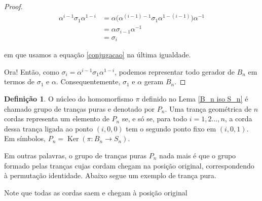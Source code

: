 \documentclass[a4paper,portuguese,11pt,twoside, leqno]{book}
\makeatletter
\DeclareMathOperator{\Ker}{Ker}
\newcounter{braid}
\newcounter{strands}
\def\cross{%
	\@ifnextchar^{\message{Got sup}\cross@sup}{\cross@sub}}
\def\cross@sup^#1_#2{\render@cross{#2}{#1}}
\def\cross@sub_#1{\@ifnextchar^{\cross@@sub{#1}}{\render@cross{#1}{1}}}
\def\cross@@sub#1^#2{\render@cross{#1}{#2}}
\def\render@cross#1#2{
	\def\strand{#1}
	\def\crossing{#2}
	\pgfmathsetmacro{\cross@y}{-\value{braid}*\braid@h}
	\pgfmathtruncatemacro{\nextstrand}{#1+1}
	\foreach \thread in {1,...,\value{strands}}
	{
		\pgfmathsetmacro{\strand@x}{\thread * \braid@w}
		\ifnum\thread=\strand
		\pgfmathsetmacro{\over@x}{\strand * \braid@w + .5*(1 - \crossing) * \braid@w}
		\pgfmathsetmacro{\under@x}{\strand * \braid@w + .5*(1 + \crossing) * \braid@w}
		\draw[braid] \pgfkeysvalueof{/tikz/braid start} +(\under@x pt,\cross@y pt) to[out=-90,in=90] +(\over@x pt,\cross@y pt -\braid@h);
		\draw[braid] \pgfkeysvalueof{/tikz/braid start} +(\over@x pt,\cross@y pt) to[out=-90,in=90] +(\under@x pt,\cross@y pt -\braid@h);
		\else
		\ifnum\thread=\nextstrand
		\else
		\draw[braid] \pgfkeysvalueof{/tikz/braid start} ++(\strand@x pt,\cross@y pt) -- ++(0,-\braid@h);
		\fi
		\fi
	}
	\stepcounter{braid}
}
\newcommand{\braid}[2][]{%
	\begingroup
	\pgfkeys{/tikz/strands=2}
	\tikzset{#1}
	\pgfkeysgetvalue{/tikz/braid width}{\braid@w}
	\pgfkeysgetvalue{/tikz/braid height}{\braid@h}
	\setcounter{braid}{0}
	\let\sigma=\cross
	#2
	\endgroup
}
\theoremstyle{definition}
\newtheorem{deff}{Definição}[section]
\makeatother
\begin{document}
\begin{proof}
		\begin{align*}
		\alpha^{i-1}\sigma_1\alpha^{1-i} &= \alpha\Big( \alpha^{(i-1)-1}\sigma_1\alpha^{1- (i-1)} \Big) \alpha^{-1} \\
		&= \alpha\sigma_{i-1}\alpha^{-1} \\
		&= \sigma_i
		\end{align*}
		
		\par\vspace{0.3cm} em que usamos a equação \eqref{conjugacao} na última igualdade. 
		
		\par\vspace{0.3cm} Ora! Então, como $\sigma_i = \alpha^{i-1}\sigma_1\alpha^{1-i}$, podemos representar todo gerador de $B_n$ em termos de $\sigma_1$ e $\alpha$. Consequentemente, $\sigma_1$ e $\alpha$ geram $B_n$.
		
	\end{proof}
	
	\begin{deff}
		\label{def P_n}
		O núcleo do homomorfismo $\pi$ definido no Lema \eqref{B_n iso S_n} é chamado grupo de tranças puras e denotado por $P_n$. Uma trança geométrica de $n$ cordas representa um elemento de $P_n$ se, e só se, para todo $i=1,2\dots,n$, a corda dessa trança ligada ao ponto $(i,0,0)$ tem o segundo ponto fixo em $(i,0,1)$. Em símbolos, $P_n = \Ker(\pi: B_n\to S_n )$.
	\end{deff}
	
	\par\vspace{0.3cm} Em outras palavras, o grupo de tranças puras $P_n$ nada mais é que o grupo formado pelas tranças cujas cordam chegam na posição original, correspondendo à permutação identidade. Abaixo segue um exemplo de trança pura.
	
	\begin{center}
	\end{center}
	\par\vspace{0.3cm} Note que todas as cordas saem e chegam à posição original
	
\end{document}
